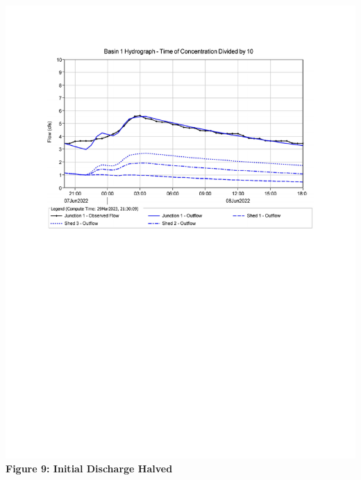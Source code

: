 \documentclass{article}
\begin{document}
\begin{center}
    \includegraphics*[scale=0.7, trim = {0 13cm 0 3.1cm}]{results/Basin_1_Hydrograph_-_Time_of_Concentration_Divided_by_10.pdf}
    \newpage
    {\large{\bf Figure 9: Initial Discharge Halved\\}}

\end{center}
\end{document}
